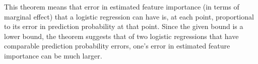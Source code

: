 \documentclass[mnsc,blindrev]{informs3}
\newcommand{\bx}{\mathbf{x}}
\begin{document}
    
    This theorem means that error in estimated feature importance (in terms of marginal effect) that a logistic regression can have is, at each point, proportional to its error in prediction probability at that point. Since the given bound is a lower bound, the theorem suggests that of two logistic regressions that have comparable prediction probability errors, one's error in estimated feature importance can be much larger. 
    
\end{document}
